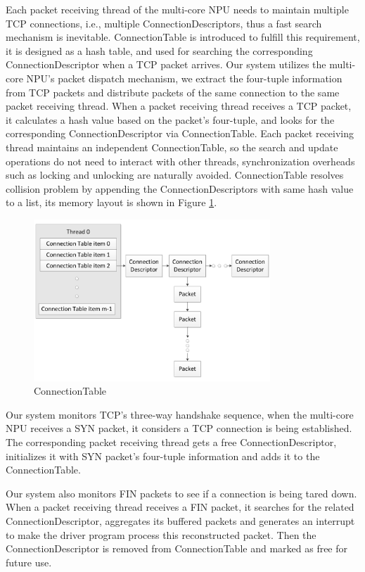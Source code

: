 \documentclass[conference]{IEEEtran}
\begin{document}
Each packet receiving thread of the multi-core NPU needs to maintain multiple TCP connections, i.e., multiple ConnectionDescriptors, thus a fast search mechanism is inevitable. ConnectionTable is introduced to fulfill this requirement, it is designed as a hash table, and used for searching the corresponding ConnectionDescriptor when a TCP packet arrives. Our system utilizes the multi-core NPU's packet dispatch mechanism, we extract the four-tuple information from TCP packets and distribute packets of the same connection to the same packet receiving thread. When a packet receiving thread receives a TCP packet, it calculates a hash value based on the packet's four-tuple, and looks for the corresponding ConnectionDescriptor via ConnectionTable. Each packet receiving thread maintains an independent ConnectionTable, so the search and update operations do not need to interact with other threads, synchronization overheads such as locking and unlocking are naturally avoided. ConnectionTable resolves collision problem by appending the ConnectionDescriptors with same hash value to a list, its memory layout is shown in Figure \ref{connection table}.
\begin{figure}[!t]
\centering
\includegraphics[width=3.5in]{connection_table}
\caption{ConnectionTable}
\label{connection table}
\end{figure}

Our system monitors TCP's three-way handshake sequence, when the multi-core NPU receives a SYN packet, it considers a TCP connection is being established. The corresponding packet receiving thread gets a free ConnectionDescriptor, initializes it with SYN packet's four-tuple information and adds it to the ConnectionTable.

Our system also monitors FIN packets to see if a connection is being tared down. When a packet receiving thread receives a FIN packet, it searches for the related ConnectionDescriptor, aggregates its buffered packets and generates an interrupt to make the driver program process this reconstructed packet. Then the ConnectionDescriptor is removed from ConnectionTable and marked as free for future use.
\end{document}
